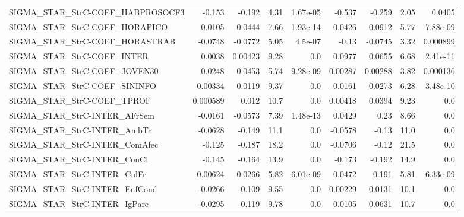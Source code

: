 \begin{tabular}{lrrrrrrrr}
SIGMA\_STAR\_StrC-COEF\_HABPROSOCF3       &      -0.153 &       -0.192 &     4.31 & 1.67e-05 &     -0.537 &      -0.259 &         2.05 &        0.0405 \\
SIGMA\_STAR\_StrC-COEF\_HORAPICO          &      0.0105 &       0.0444 &     7.66 & 1.93e-14 &     0.0426 &      0.0912 &         5.77 &      7.88e-09 \\
SIGMA\_STAR\_StrC-COEF\_HORASTRAB         &     -0.0748 &      -0.0772 &     5.05 &  4.5e-07 &      -0.13 &     -0.0745 &         3.32 &      0.000899 \\
SIGMA\_STAR\_StrC-COEF\_INTER             &      0.0038 &      0.00423 &     9.28 &      0.0 &     0.0977 &      0.0655 &         6.68 &      2.41e-11 \\
SIGMA\_STAR\_StrC-COEF\_JOVEN30           &      0.0248 &       0.0453 &     5.74 & 9.28e-09 &    0.00287 &     0.00288 &         3.82 &      0.000136 \\
SIGMA\_STAR\_StrC-COEF\_SININFO           &     0.00334 &       0.0119 &     9.37 &      0.0 &    -0.0161 &     -0.0273 &         6.28 &      3.48e-10 \\
SIGMA\_STAR\_StrC-COEF\_TPROF             &    0.000589 &        0.012 &     10.7 &      0.0 &    0.00418 &      0.0394 &         9.23 &           0.0 \\
SIGMA\_STAR\_StrC-INTER\_AFrSem           &     -0.0161 &      -0.0573 &     7.39 & 1.48e-13 &     0.0429 &        0.23 &         8.66 &           0.0 \\
SIGMA\_STAR\_StrC-INTER\_AmbTr            &     -0.0628 &       -0.149 &     11.1 &      0.0 &    -0.0578 &       -0.13 &         11.0 &           0.0 \\
SIGMA\_STAR\_StrC-INTER\_ComAfec          &      -0.125 &       -0.187 &     18.2 &      0.0 &    -0.0706 &       -0.12 &         21.5 &           0.0 \\
SIGMA\_STAR\_StrC-INTER\_ConCl            &      -0.145 &       -0.164 &     13.9 &      0.0 &     -0.173 &      -0.192 &         14.9 &           0.0 \\
SIGMA\_STAR\_StrC-INTER\_CulFr            &     0.00624 &       0.0266 &     5.82 & 6.01e-09 &     0.0472 &       0.191 &         5.81 &      6.33e-09 \\
SIGMA\_STAR\_StrC-INTER\_EnfCond          &     -0.0266 &       -0.109 &     9.55 &      0.0 &    0.00229 &      0.0131 &         10.1 &           0.0 \\
SIGMA\_STAR\_StrC-INTER\_IgPare           &     -0.0295 &       -0.119 &     9.78 &      0.0 &     0.0105 &      0.0631 &         10.7 &           0.0 \\

\end{tabular}
